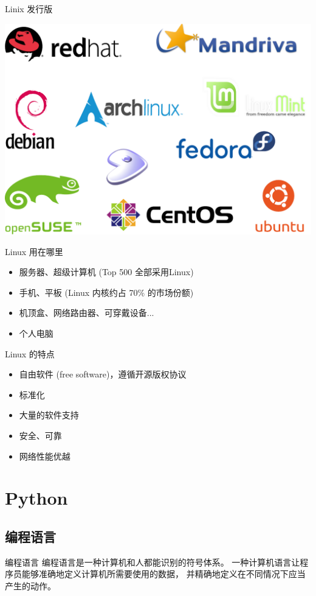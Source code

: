 \documentclass[14pt,t]{beamer}
\begin{document}
\begin{frame}{Linix 发行版}
\begin{center}
\includegraphics[width=.5\textwidth]{linux_distros.pdf}
\end{center}
\end{frame}

\begin{frame}{Linux 用在哪里}
\begin{itemize}
    \item 服务器、超级计算机 (Top 500 全部采用Linux)
    \item 手机、平板 (Linux 内核约占 70\% 的市场份额)
    \item 机顶盒、网络路由器、可穿戴设备...
    \item 个人电脑
\end{itemize}
\end{frame}

\begin{frame}{Linux 的特点}
\begin{itemize}
    \item 自由软件 (free software)，遵循开源版权协议
    \item 标准化
    \item 大量的软件支持
    \item 安全、可靠
    \item 网络性能优越
\end{itemize}
\end{frame}

\section{Python}

\subsection{编程语言}
\begin{frame}{编程语言}
    编程语言是一种计算机和人都能识别的符号体系。
    一种计算机语言让程序员能够准确地定义计算机所需要使用的数据，
    并精确地定义在不同情况下应当产生的动作。
\end{frame}
\end{document}
